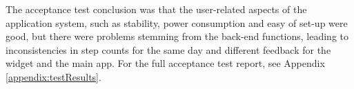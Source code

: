 The acceptance test conclusion was that the user-related aspects of the application system, such as stability, power consumption and easy of set-up were good, but there were problems stemming from the back-end functions, leading to inconsistencies in step counts for the same day and different feedback for the widget and the main app. For the full acceptance test report, see Appendix \ref{appendix:testResults}.


